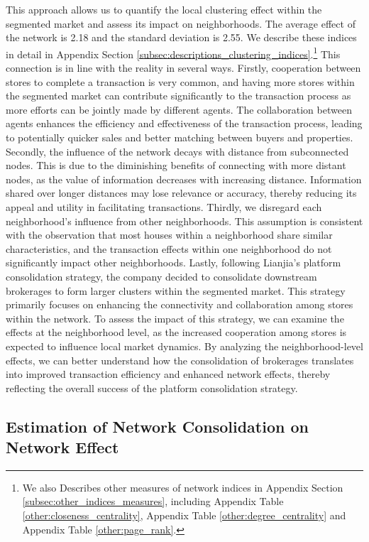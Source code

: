 \documentclass[11pt]{article}
\begin{document}
This approach allows us to quantify the local clustering effect within the segmented market and assess its impact on neighborhoods. The average effect of the network is 2.18 and the standard deviation is 2.55. We describe these indices in detail in Appendix Section \ref{subsec:descriptions_clustering_indices}.\footnote{We also Describes other measures of network indices in Appendix Section \ref{subsec:other_indices_measures}, including Appendix Table \ref{other:closeness_centrality}, Appendix Table \ref{other:degree_centrality} and Appendix Table \ref{other:page_rank}.} This connection is in line with the reality in several ways. Firstly, cooperation between stores to complete a transaction is very common, and having more stores within the segmented market can contribute significantly to the transaction process as more efforts can be jointly made by different agents. The collaboration between agents enhances the efficiency and effectiveness of the transaction process, leading to potentially quicker sales and better matching between buyers and properties. Secondly, the influence of the network decays with distance from subconnected nodes. This is due to the diminishing benefits of connecting with more distant nodes, as the value of information decreases with increasing distance. Information shared over longer distances may lose relevance or accuracy, thereby reducing its appeal and utility in facilitating transactions. Thirdly, we disregard each neighborhood's influence from other neighborhoods. This assumption is consistent with the observation that most houses within a neighborhood share similar characteristics, and the transaction effects within one neighborhood do not significantly impact other neighborhoods. Lastly, following Lianjia's platform consolidation strategy, the company decided to consolidate downstream brokerages to form larger clusters within the segmented market. This strategy primarily focuses on enhancing the connectivity and collaboration among stores within the network. To assess the impact of this strategy, we can examine the effects at the neighborhood level, as the increased cooperation among stores is expected to influence local market dynamics. By analyzing the neighborhood-level effects, we can better understand how the consolidation of brokerages translates into improved transaction efficiency and enhanced network effects, thereby reflecting the overall success of the platform consolidation strategy.

\subsection{Estimation of Network Consolidation on Network Effect} \label{subsec:platform_network_effect}
\end{document}
